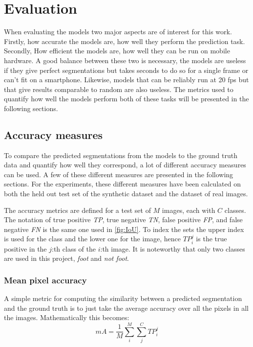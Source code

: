 \documentclass{kththesis}
\begin{document}
\section{Evaluation}
When evaluating the models two major aspects are of interest for this work.
Firstly, how accurate the models are, how well they perform the prediction task.
Secondly, How efficient the models are, how well they can be run on mobile
hardware. A good balance between these two is necessary, the models are useless
if they give perfect segmentations but takes seconds to do so for a single frame
or can't fit on a smartphone. Likewise, models that can be reliably run at 20
fps but that give results comparable to random are also useless. The metrics
used to quantify how well the models perform both of these tasks will be
presented in the following sections.

\subsection{Accuracy measures} \label{sec:accuracy}
To compare the predicted segmentations from the models to the ground truth data
and quantify how well they correspond, a lot of different accuracy measures can
be used. A few of these different measures are presented in the following
sections. For the experiments, these different measures have been calculated on
both the held out test set of the synthetic dataset and the dataset of real
images.

The accuracy metrics are defined for a test set of \(M\) images, each with \(C\)
classes. The notation of true positive \textit{TP}, true negative \textit{TN},
false positive \textit{FP}, and false negative \textit{FN} is the same one used
in \cref{fig:IoU}. To index the sets the upper index is used for the class and
the lower one for the image, hence \(\textit{TP}^j_i\) is the true positive in
the \(j\):th class of the \(i\):th image. It is noteworthy that only two
classes are used in this project, \textit{foot} and \textit{not foot}.
 
\subsubsection{Mean pixel accuracy}
A simple metric for computing the similarity between a predicted
segmentation and the ground truth is to just take the average accuracy over all
the pixels in all the images. Mathematically this becomes:
\[\textit{mA} = \frac{1}{M}\sum^M_i\sum^C_j\textit{TP}_i^j\]
\end{document}
